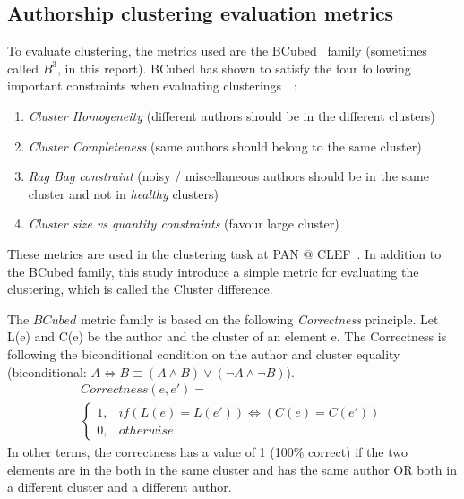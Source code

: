 \subsection{Authorship clustering evaluation metrics}

To evaluate clustering, the metrics used are the BCubed~\cite{bcubed} family (sometimes called $B^3$, in this report).
BCubed has shown to satisfy the four following important constraints when evaluating clusterings~\cite{bcubed}~:

\begin{enumerate}
  \item \textit{Cluster Homogeneity} (different authors should be in the different clusters)
  \item \textit{Cluster Completeness} (same authors should belong to the same cluster)
  \item \textit{Rag Bag constraint} (noisy / miscellaneous authors should be in the same cluster and not in \textit{healthy} clusters)
  \item \textit{Cluster size vs quantity constraints} (favour large cluster)
\end{enumerate}

These metrics are used in the clustering task at PAN @ CLEF~\cite{pan16}.
In addition to the BCubed family, this study introduce a simple metric for evaluating the clustering, which is called the Cluster difference.

\begin{definition}
  The $BCubed$ metric family is based on the following \textit{Correctness} principle.
  Let L(e) and C(e) be the author and the cluster of an element e.
  The Correctness is following the biconditional condition on the author and cluster equality (biconditional: $A \Longleftrightarrow B \equiv (A \land B) \lor (\neg A \land \neg B)$).
  \begin{gather*}
    Correctness(e, e') = \\
    \begin{cases}
      1, & if (L(e) = L(e')) \Longleftrightarrow (C(e) = C(e'))\\
      0, & otherwise
    \end{cases}
  \end{gather*}
  In other terms, the correctness has a value of 1 (100\% correct) if the two elements are in the both in the same cluster and has the same author OR both in a different cluster and a different author.
\end{definition}

